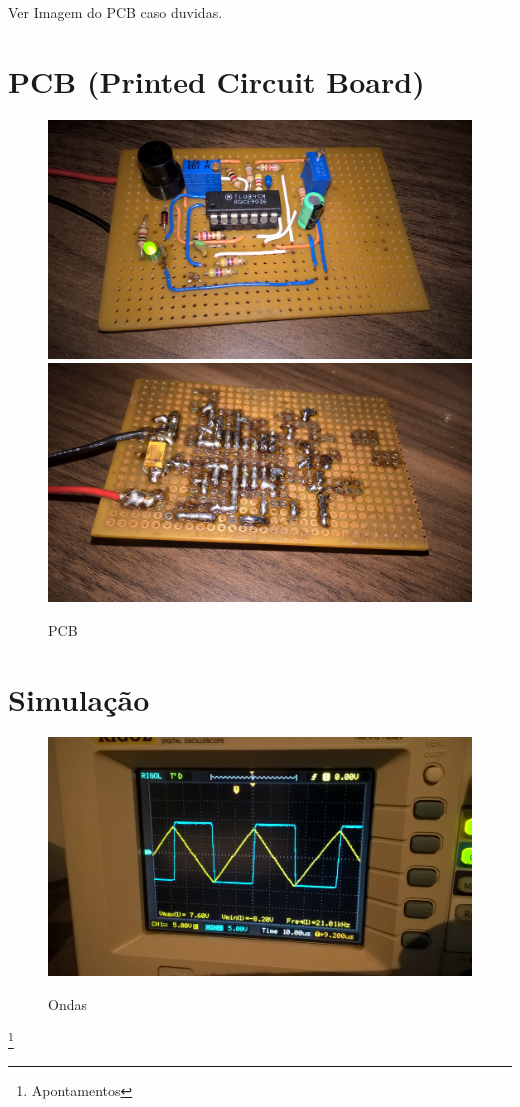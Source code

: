 \documentclass[titlepage, a4paper, 10pt, reqno, openany]{report}
\begin{document}
Ver Imagem do PCB caso duvidas. \\
\section{PCB (Printed Circuit Board)}
\begin{figure}[ht]
\begin{center}
	\includegraphics[scale=0.07]{./image/placa_1.jpg} \hspace{0.2cm}
	\includegraphics[scale=0.07]{./image/placa_2.jpg}
\end{center}
\caption{PCB}
\end{figure}\par
\section{Simulação}
\begin{figure}[H]
	\centering
	\includegraphics[scale=0.13]{./image/Ondas.jpg}\\
	\caption{Ondas}
\end{figure}
\newpage
\newpage
\footnote{Apontamentos}
%
	
\end{document}
